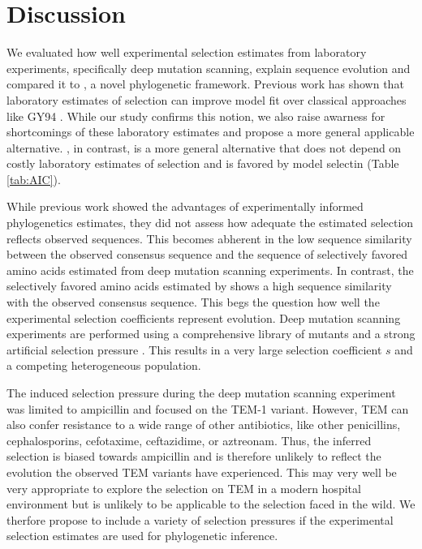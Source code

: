 \documentclass[12pt]{article}
\begin{document}
\section*{Discussion}

We evaluated how well experimental selection estimates from laboratory experiments, specifically deep mutation scanning, explain sequence evolution and compared it to \selac, a novel phylogenetic framework.
Previous work has shown that laboratory estimates of selection can improve model fit over classical approaches like GY94 \citep{bloom2014, bloom2017}.
While our study confirms this notion, we also raise awarness for shortcomings of these laboratory estimates and propose a more general applicable alternative.
\selac, in contrast, is a more general alternative that does not depend on costly laboratory estimates of selection and is favored by model selectin (Table \ref{tab:AIC}).

While previous work showed the advantages of experimentally informed phylogenetics estimates, they did not assess how adequate the estimated selection reflects observed sequences.
This becomes abherent in the low sequence similarity between the observed consensus sequence and the sequence of selectively favored amino acids estimated from deep mutation scanning experiments.
In contrast, the selectively favored amino acids estimated by \selac shows a high sequence similarity with the observed consensus sequence.
This begs the question how well the experimental selection coefficients represent evolution.
Deep mutation scanning experiments are performed using a comprehensive library of mutants and a strong artificial selection pressure \citep{FirnbergAndOstermeier2012, Jain2014, FowlerAndFields2014, Fowler2014}.
This results in a very large selection coefficient $s$ and a competing heterogeneous population.

The induced selection pressure during the deep mutation scanning experiment was limited to ampicillin \citep{stiffler2016} and focused on the TEM-1 variant.
However, TEM can also confer resistance to a wide range of other antibiotics, like other penicillins, cephalosporins, cefotaxime, ceftazidime, or aztreonam.
Thus, the inferred selection is biased towards ampicillin and is therefore unlikely to reflect the evolution the observed TEM variants have experienced.
This may very well be very appropriate to explore the selection on TEM in a modern hospital environment but is unlikely to be applicable to the selection faced in the wild.
We therfore propose to include a variety of selection pressures if the experimental selection estimates are used for phylogenetic inference.
\end{document}
